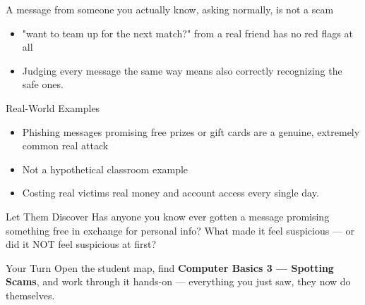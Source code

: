 \documentclass[aspectratio=169]{beamer}
\begin{document}
\begin{frame}{A message from someone you actually know, asking normally, is not a scam}
    \large
    \begin{itemize}
        \item "want to team up for the next match?" from a real friend has no red flags at all
        \item Judging every message the same way means also correctly recognizing the safe ones.
    \end{itemize}
\end{frame}

\begin{frame}{Real-World Examples}
    \large
    \begin{itemize}
        \item Phishing messages promising free prizes or gift cards are a genuine, extremely common real attack
        \item Not a hypothetical classroom example
        \item Costing real victims real money and account access every single day.
    \end{itemize}
\end{frame}


\begin{frame}{Let Them Discover}
    \Large
    Has anyone you know ever gotten a message promising something free in exchange for personal info? What made it feel suspicious — or did it NOT feel suspicious at first?
\end{frame}

\begin{frame}{Your Turn}
    \Large
    Open the student map, find \textbf{Computer Basics 3 — Spotting Scams}, and work through it
    hands-on --- everything you just saw, they now do themselves.
\end{frame}
\end{document}
